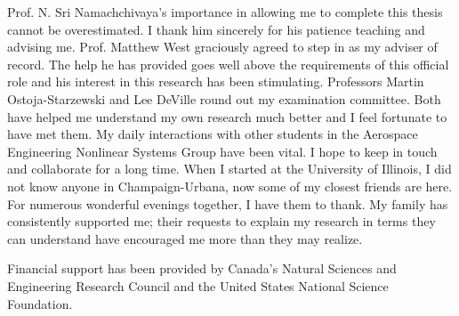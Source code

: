 Prof. N. Sri Namachchivaya's importance in allowing me to complete this thesis cannot be overestimated. I thank him sincerely for his patience teaching and advising me. Prof. Matthew West graciously agreed to step in as my adviser of record. The help he has provided goes well above the requirements of this official role and his interest in this research has been stimulating. Professors Martin Ostoja-Starzewski and Lee DeVille round out my examination committee. Both have helped me understand my own research much better and I feel fortunate to have met them. My daily interactions with other students in the Aerospace Engineering Nonlinear Systems Group have been vital. I hope to keep in touch and collaborate for a long time. When I started at the University of Illinois, I did not know anyone in Champaign-Urbana, now some of my closest friends are here. For numerous wonderful evenings together, I have them to thank. My family has consistently supported me; their requests to explain my research in terms they can understand have encouraged me more than they may realize.

Financial support has been provided by Canada's Natural Sciences and Engineering Research Council and the United States National Science Foundation.

